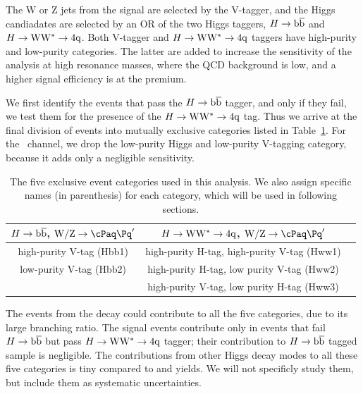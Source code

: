 The W or Z jets from the signal are selected by the
V-tagger, and the Higgs candiadates are selected by an OR of the two
Higgs taggers, $H\to\mathrm{b\overline{b}}$ and $H\to{\rm W}{\rm W}^*\to4{\rm q}$.  Both V-tagger and $H\to{\rm W}{\rm W}^*\to4{\rm q}$ taggers
have high-purity and
low-purity categories.  The latter are added to increase the
sensitivity of the analysis at high resonance masses, where the QCD
background is low, and a higher signal efficiency is at the premium.

We first identify the
events that pass the $H\to\mathrm{b\overline{b}}$ tagger, and only if they fail,  we
test them for the presence of the $H\to{\rm W}{\rm W}^*\to4{\rm q}$ tag.
Thus we arrive at the final division of events into mutually exclusive
categories listed in Table~\ref{table:categories}.
For the \HwwVqq\ channel, we drop the
low-purity Higgs and low-purity V-tagging category, because it
adds only a negligible sensitivity.


\begin{table}[htb]
\begin{center}
  \caption{
    The five exclusive event categories used in this analysis.
    We also assign specific names (in parenthesis) for each category, which will be 
    used in following sections.   
    \label{table:categories}}
\begin{tabular}{ ccc}
\hline
$H\to\mathrm{b\overline{b}}$, $\Vqq$ & $H\to{\rm W}{\rm W}^*\to4{\rm q}$, $\Vqq$  \\
\hline
high-purity V-tag (Hbb1)  &  high-purity H-tag, high-purity V-tag (Hww1)  \\
low-purity  V-tag (Hbb2) &  high-purity H-tag, low purity V-tag (Hww2) \\
                           &  high-purity V-tag, low purity H-tag (Hww3) \\
\hline
\end{tabular}
\end{center}
\end{table}

The events from the \HbbVqq decay could contribute to all the five
categories, due to its large branching ratio.
The \HwwVqq signal events contribute only in events that fail
$H\to\mathrm{b\overline{b}}$ but pass $H\to{\rm W}{\rm W}^*\to4{\rm q}$ tagger; their contribution to
$H\to\mathrm{b\overline{b}}$ tagged sample is negligible.
The contributions from other Higgs decay modes to all these five categories
is tiny compared to \HbbVqq and \HwwVqq yields.  
We will not specificly study them, but include them as
 systematic uncertainties.

